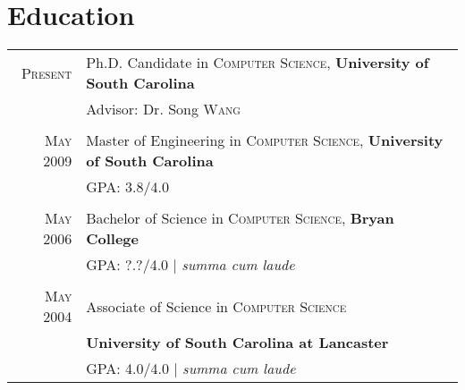 \documentclass[a4paper,10pt]{article}
\begin{document}
\section{Education}
\begin{tabular}{r p{12cm}}	
 \textsc{Present} & Ph.D. Candidate in \textsc{Computer Science}, \textbf{University of South Carolina}\\
&%
\small Advisor: Dr. Song \textsc{Wang} %
\\&\\
 \textsc{May} 2009 & Master of Engineering in \textsc{Computer Science}, \textbf{University of South Carolina}\\
&\normalsize \textsc{GPA}: 3.8/4.0
\\&\\
\textsc{May} 2006& Bachelor of Science in \textsc{Computer Science}, \textbf{Bryan College} \\
&\normalsize \textsc{GPA}: ?.?/4.0 | \small\emph{summa cum laude}
\\&\\
\textsc{May} 2004& Associate of Science in \textsc{Computer Science}\\
&\textbf{University of South Carolina at Lancaster} \\
&\normalsize \textsc{GPA}: 4.0/4.0 | \small\emph{summa cum laude}\\
\end{tabular}
\end{document}
